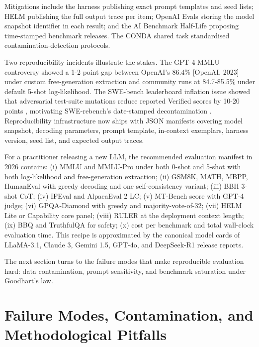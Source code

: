 \documentclass{article}
\begin{document}
Mitigations include the harness publishing exact prompt templates and seed lists; HELM publishing the full output trace per item; OpenAI Evals storing the model snapshot identifier in each result; and the AI Benchmark Half-Life \cite{white20242024} proposing time-stamped benchmark releases. The CONDA shared task \cite{sainz20242024} standardised contamination-detection protocols.

Two reproducibility incidents illustrate the stakes. The GPT-4 MMLU controversy showed a 1-2 point gap between OpenAI's 86.4\% {[}OpenAI, 2023{]} under custom free-generation extraction and community runs at 84.7-85.5\% under default 5-shot log-likelihood. The SWE-bench leaderboard inflation issue showed that adversarial test-suite mutations reduce reported Verified scores by 10-20 points \cite{yu20262026}, motivating SWE-rebench's date-stamped decontamination \cite{badertdinov20252025}. Reproducibility infrastructure now ships with JSON manifests covering model snapshot, decoding parameters, prompt template, in-context exemplars, harness version, seed list, and expected output traces.

For a practitioner releasing a new LLM, the recommended evaluation manifest in 2026 contains: (i) MMLU and MMLU-Pro under both 0-shot and 5-shot with both log-likelihood and free-generation extraction; (ii) GSM8K, MATH, MBPP, HumanEval with greedy decoding and one self-consistency variant; (iii) BBH 3-shot CoT; (iv) IFEval and AlpacaEval 2 LC; (v) MT-Bench score with GPT-4 judge; (vi) GPQA-Diamond with greedy and majority-vote-of-32; (vii) HELM Lite or Capability core panel; (viii) RULER at the deployment context length; (ix) BBQ and TruthfulQA for safety; (x) cost per benchmark and total wall-clock evaluation time. This recipe is approximated by the canonical model cards of LLaMA-3.1, Claude 3, Gemini 1.5, GPT-4o, and DeepSeek-R1 release reports.

The next section turns to the failure modes that make reproducible evaluation hard: data contamination, prompt sensitivity, and benchmark saturation under Goodhart's law.

\section{Failure Modes, Contamination, and Methodological Pitfalls}\label{failure-modes-contamination-and-methodological-pitfalls}
\end{document}
